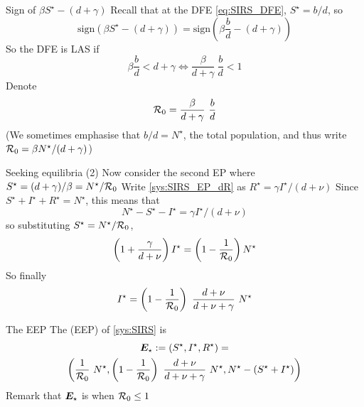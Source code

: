 \documentclass[aspectratio=169]{beamer}\usepackage[]{graphicx}\usepackage[]{xcolor}
\begin{document}
\begin{frame}{Sign of $\beta S^\star-(d+\gamma)$}
Recall that at the DFE \eqref{eq:SIRS_DFE}, $S^\star=b/d$, so
\[
\text{sign}(\beta S^\star-(d+\gamma))
=\text{sign}\left(
\beta\frac{b}{d} -(d+\gamma)
\right)
\]
So the DFE is LAS if
\[
\beta\frac bd < d+\gamma
\iff \frac\beta{d+\gamma}\ \frac bd <1
\]
Denote
\begin{equation}\label{eq:SIRS_R0}
\mathcal{R}_0 = \frac\beta{d+\gamma}\ \frac bd
\end{equation}
\vfill
(We sometimes emphasise that $b/d=N^\star$, the total population, and thus write $\mathcal{R}_0=\beta N^\star/(d+\gamma)$)
\end{frame}


\begin{frame}{Seeking equilibria (2)}
Now consider the second EP where $S^\star=(d+\gamma)/\beta=N^\star/\mathcal{R}_0$
\vfill
Write \eqref{sys:SIRS_EP_dR} as $R^\star=\gamma I^\star/(d+\nu)$
\vfill
Since $S^\star+I^\star+R^\star=N^\star$, this means that
\[
N^\star-S^\star-I^\star = \gamma I^\star/(d+\nu)
\]
so substituting $S^\star = N^\star/\mathcal{R}_0$,
\[
\left(1+\frac{\gamma}{d+\nu}\right)I^\star = \left(1-\frac{1}{\mathcal{R}_0}\right)N^\star
\]
So finally
\[
I^\star = \left(1-\frac{1}{\mathcal{R}_0}\right)\
\frac{d+\nu}{d+\nu+\gamma}\ N^\star
\]
\end{frame}


\begin{frame}{The EEP}
The  (EEP) of \eqref{sys:SIRS} is
\begin{multline}\label{eq:SIRS_EEP}
\bm{E}_\star:=(S^\star,I^\star,R^\star) = \\
\left(
\frac{1}{\mathcal{R}_0}\ N^\star,
\left(1-\frac{1}{\mathcal{R}_0}\right)\
\frac{d+\nu}{d+\nu+\gamma}\ N^\star,
N^\star-(S^\star+I^\star)
\right)
\end{multline}
\vfill
Remark that $\bm{E}_\star$ is  when $\mathcal{R}_0\leq 1$
\end{frame}
\end{document}
